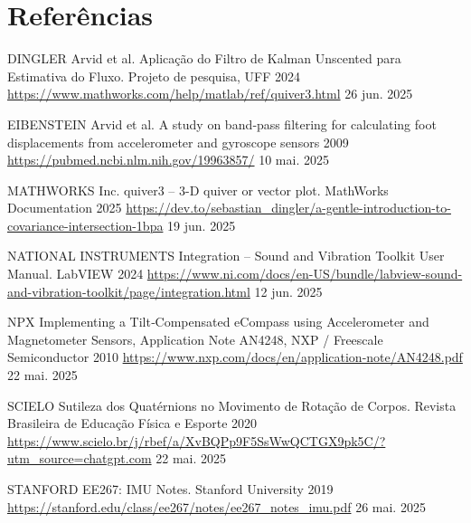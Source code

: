\newpage

\pagestyle{modeloReferencias}


\section*{Referências}
\vspace{-1cm}




    {DINGLER}
    {Arvid et al. Aplicação do Filtro de Kalman Unscented para Estimativa do Fluxo. Projeto de pesquisa, UFF}
    {2024}
    {\url{https://www.mathworks.com/help/matlab/ref/quiver3.html}}
    {26 jun. 2025}

    {EIBENSTEIN}
    {Arvid et al. A study on band‑pass filtering for calculating foot displacements from accelerometer and gyroscope sensors}
    {2009}
    {\url{https://pubmed.ncbi.nlm.nih.gov/19963857/}}
    {10 mai. 2025}

    {MATHWORKS}
    {Inc. quiver3 – 3-D quiver or vector plot. MathWorks Documentation}
    {2025}
    {\url{https://dev.to/sebastian_dingler/a-gentle-introduction-to-covariance-intersection-1bpa}}
    {19 jun. 2025}

    {NATIONAL INSTRUMENTS}
    {Integration – Sound and Vibration Toolkit User Manual. LabVIEW}
    {2024}
    {\url{https://www.ni.com/docs/en-US/bundle/labview-sound-and-vibration-toolkit/page/integration.html}}
    {12 jun. 2025}

    {NPX}
    {Implementing a Tilt‑Compensated eCompass using Accelerometer and Magnetometer Sensors, Application Note AN4248, NXP / Freescale Semiconductor}
    {2010}
    {\url{https://www.nxp.com/docs/en/application-note/AN4248.pdf}}
    {22 mai. 2025}

    {SCIELO}
    {Sutileza dos Quatérnions no Movimento de Rotação de Corpos. Revista Brasileira de Educação Física e Esporte}
    {2020}
    {\url{https://www.scielo.br/j/rbef/a/XvBQPp9F5SsWwQCTGX9pk5C/?utm_source=chatgpt.com}}
    {22 mai. 2025}

    {STANFORD}
    {EE267: IMU Notes. Stanford University}
    {2019}
    {\url{https://stanford.edu/class/ee267/notes/ee267_notes_imu.pdf}}
    {26 mai. 2025}

